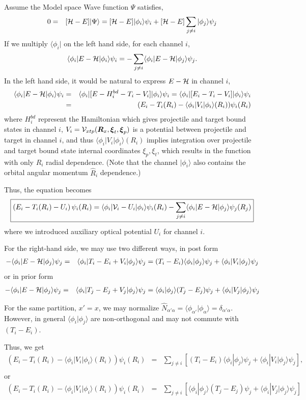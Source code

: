 \documentclass[11pt]{book}
\def\bm{\boldsymbol}
\def\la{\langle}
\def\ra{\rangle}
\newcommand{\bea}{\begin{eqnarray}}
\newcommand{\eea}{\end{eqnarray}}
\newcommand{\no}{\nonumber \\}
\begin{document}
Assume the Model space Wave function $\Psi$ satisfies,
\bea 
0&=&[{\cal H}-E]|\Psi\ra 
=[{\cal H}-E]|\phi_i\ra \psi_i +
[{\cal H}-E]\sum_{j\neq i}|\phi_j\ra \psi_j
\eea 
If we multiply $\la \phi_i|$ on the left hand side, for each channel $i$, 
\bea 
\la \phi_i|E-{\cal H}|\phi_i\ra \psi_i
= -\sum_{j\neq i}\la \phi_i|E-{\cal H}|\phi_j\ra \psi_j.
\eea 
In the left hand side, it would be natural to express $E-{\cal H}$ in channel $i$,
\bea 
\la \phi_i|E-{\cal H}|\phi_i\ra \psi_i
&=&\la \phi_i|[E-H_i^{bd}-T_i-V_i]|\phi_i\ra \psi_i
=\la \phi_i|[E_i-T_i-V_i]|\phi_i\ra \psi_i \no 
&=&(E_i-T_i(R_i)-\la\phi_i|V_i|\phi_i\ra(R_i))\psi_i(R_i)
\eea 
where $H_i^{bd}$ represent the Hamiltonian which gives projectile and target bound states
in channel $i$,
$V_i={\cal V}_{xtp}({\bm R}_x,{\bm \xi}_t,{\bm \xi}_p)$ is a potential between 
projectile and target in channel $i$, and thus
$\la\phi_i|V_i|\phi_i\ra(R_i)$ implies integration over projectile and target bound state internal coordinates $\xi_p,\xi_t$,
which results in the function with only $R_i$ radial dependence. 
(Note that the channel $|\phi_i\ra$  also contains the orbital angular momentum $\hat{R}_i$ dependence.)

Thus, the equation becomes
\bea
\boxed{  
\left(E_i- T_i(R_i)-U_i\right)\psi_i(R_i) = \la \phi_i|{\cal V}_i-U_i|\phi_i\ra \psi_i(R_i)
                               -\sum_{j\neq i} \la \phi_i|E-{\cal H}|\phi_j\ra \psi_j(R_j) 
                            }
\eea 
where we introduced auxiliary optical potential $U_i$ for channel $i$. 


For the right-hand side, we may use two different ways, in post form
\bea
-\la \phi_i|E-{\cal H}|\phi_j\ra \psi_j
&=& \la \phi_i|T_i-E_i+V_i|\phi_j\ra \psi_j 
= (T_i-E_i) \la \phi_i|\phi_j\ra\psi_j
+\la \phi_i|V_i|\phi_j\ra \psi_j  
\eea 
or in prior form
\bea 
-\la \phi_i|E-{\cal H}|\phi_j\ra \psi_j
&=& \la \phi_i|T_j-E_j+V_j|\phi_j\ra \psi_j 
=  \la \phi_i|\phi_j\ra (T_j-E_j)\psi_j
+\la \phi_i|V_j|\phi_j\ra \psi_j  
\eea 

For the same partition, $x'=x$, we may normalize 
$\hat{N}_{\alpha'\alpha}=\la \phi_{\alpha'}|\phi_{\alpha}\ra=\delta_{\alpha'\alpha}$.
However, in general $\la \phi_i|\phi_j\ra$ are non-orthogonal and may not commute with  $(T_i-E_i)$.

Thus, we get 
\bea 
(E_i-T_i(R_i)-\la\phi_i|V_i|\phi_i\ra(R_i))\psi_i(R_i)
&=&\sum_{j\neq i}\left[ (T_i-E_i) \la \phi_i|\phi_j\ra\psi_j
+\la \phi_i|V_i|\phi_j\ra \psi_j \right] ,\no 
\eea 
or 
\bea 
(E_i-T_i(R_i)-\la\phi_i|V_i|\phi_i\ra(R_i))\psi_i(R_i)
&=&\sum_{j\neq i} \left[ \la \phi_i|\phi_j\ra (T_j-E_j)\psi_j
+\la \phi_i|V_j|\phi_j\ra \psi_j\right]       
\eea 
\end{document}
